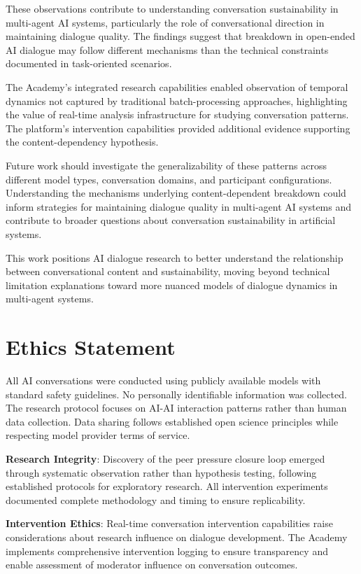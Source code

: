 \documentclass[11pt,letterpaper]{article}
\newcommand{\theacademy}{The Academy}
\begin{document}
These observations contribute to understanding conversation sustainability in multi-agent AI systems, particularly the role of conversational direction in maintaining dialogue quality. The findings suggest that breakdown in open-ended AI dialogue may follow different mechanisms than the technical constraints documented in task-oriented scenarios.

\theacademy{}'s integrated research capabilities enabled observation of temporal dynamics not captured by traditional batch-processing approaches, highlighting the value of real-time analysis infrastructure for studying conversation patterns. The platform's intervention capabilities provided additional evidence supporting the content-dependency hypothesis.

Future work should investigate the generalizability of these patterns across different model types, conversation domains, and participant configurations. Understanding the mechanisms underlying content-dependent breakdown could inform strategies for maintaining dialogue quality in multi-agent AI systems and contribute to broader questions about conversation sustainability in artificial systems.

This work positions AI dialogue research to better understand the relationship between conversational content and sustainability, moving beyond technical limitation explanations toward more nuanced models of dialogue dynamics in multi-agent systems.

\section*{Ethics Statement}

All AI conversations were conducted using publicly available models with standard safety guidelines. No personally identifiable information was collected. The research protocol focuses on AI-AI interaction patterns rather than human data collection. Data sharing follows established open science principles while respecting model provider terms of service.

\textbf{Research Integrity}: Discovery of the peer pressure closure loop emerged through systematic observation rather than hypothesis testing, following established protocols for exploratory research. All intervention experiments documented complete methodology and timing to ensure replicability.

\textbf{Intervention Ethics}: Real-time conversation intervention capabilities raise considerations about research influence on dialogue development. \theacademy{} implements comprehensive intervention logging to ensure transparency and enable assessment of moderator influence on conversation outcomes.
\end{document}
